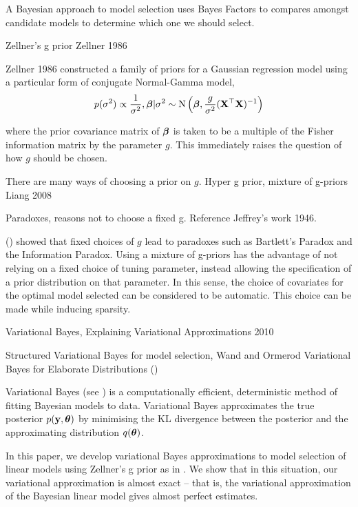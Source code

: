 \documentclass{amsart}[12pt]
\begin{document}
A Bayesian approach to model selection uses Bayes Factors to compares amongst candidate models to determine 
which one we should select.


Zellner's g prior Zellner 1986

Zellner 1986 constructed a family of priors for a Gaussian regression model using a particular form
of conjugate Normal-Gamma model,
\begin{equation*}
p(\sigma^2) \propto \frac{1}{\sigma^2}, {\boldsymbol \beta}|\sigma^2 \sim \text{N}\left({\boldsymbol \beta}, \frac{g}{\sigma^2} ({\bf X}^\top {\bf X})^{-1}\right)
\end{equation*}

where the prior covariance matrix of ${\boldsymbol \beta}$ is taken to be a multiple of the Fisher information 
matrix by the parameter $g$. This immediately raises the question of how $g$ should be chosen.

There are many ways of choosing a prior on $g$.
Hyper g prior, mixture of g-priors Liang 2008

Paradoxes, reasons not to choose a fixed g. Reference Jeffrey's work 1946. \cite{Society2016}

(\cite{Liang2008}) showed that fixed choices of $g$ lead to paradoxes such as Bartlett's Paradox and
the Information Paradox.
Using a mixture of g-priors has the advantage of not relying on a fixed choice of tuning
parameter, instead allowing the specification of a prior distribution on that parameter. In this sense, the 
choice of covariates for the optimal model selected can be considered to be automatic. This choice can be
made while inducing sparsity.


Variational Bayes, Explaining Variational Approximations 2010

Structured Variational Bayes for model selection, Wand and Ormerod Variational Bayes for Elaborate 
Distributions (\cite{Wand2011})


Variational Bayes (see \cite{Ormerod2010}) is a computationally efficient, deterministic method of fitting
Bayesian models to data. Variational Bayes approximates the true posterior $p({\bf y}, {\boldsymbol \theta})$ by minimising the
KL divergence between the posterior and the  approximating distribution $q({\boldsymbol \theta})$.



In this paper, we develop variational Bayes approximations to model selection of linear models using
Zellner's g prior as in \cite{Liang2008}. We show that in this situation, our variational approximation
is almost exact -- that is, the variational approximation of the Bayesian linear model gives almost perfect
estimates.
\end{document}
